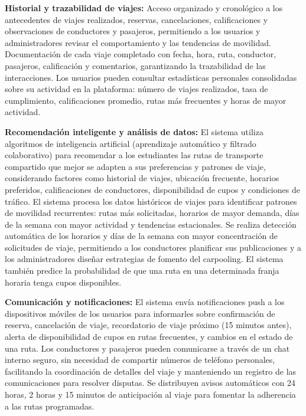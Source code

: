 \documentclass[11pt,a4paper]{article}
\begin{document}
\textbf{Historial y trazabilidad de viajes:} Acceso organizado y cronológico a los antecedentes de viajes realizados, reservas, cancelaciones, calificaciones y observaciones de conductores y pasajeros, permitiendo a los usuarios y administradores revisar el comportamiento y las tendencias de movilidad. Documentación de cada viaje completado con fecha, hora, ruta, conductor, pasajeros, calificación y comentarios, garantizando la trazabilidad de las interacciones. Los usuarios pueden consultar estadísticas personales consolidadas sobre su actividad en la plataforma: número de viajes realizados, tasa de cumplimiento, calificaciones promedio, rutas más frecuentes y horas de mayor actividad.

\textbf{Recomendación inteligente y análisis de datos:} El sistema utiliza algoritmos de inteligencia artificial (aprendizaje automático y filtrado colaborativo) para recomendar a los estudiantes las rutas de transporte compartido que mejor se adapten a sus preferencias y patrones de viaje, considerando factores como historial de viajes, ubicación frecuente, horarios preferidos, calificaciones de conductores, disponibilidad de cupos y condiciones de tráfico. El sistema procesa los datos históricos de viajes para identificar patrones de movilidad recurrentes: rutas más solicitadas, horarios de mayor demanda, días de la semana con mayor actividad y tendencias estacionales. Se realiza detección automática de los horarios y días de la semana con mayor concentración de solicitudes de viaje, permitiendo a los conductores planificar sus publicaciones y a los administradores diseñar estrategias de fomento del carpooling. El sistema también predice la probabilidad de que una ruta en una determinada franja horaria tenga cupos disponibles.

\textbf{Comunicación y notificaciones:} El sistema envía notificaciones push a los dispositivos móviles de los usuarios para informarles sobre confirmación de reserva, cancelación de viaje, recordatorio de viaje próximo (15 minutos antes), alerta de disponibilidad de cupos en rutas frecuentes, y cambios en el estado de una ruta. Los conductores y pasajeros pueden comunicarse a través de un chat interno seguro, sin necesidad de compartir números de teléfono personales, facilitando la coordinación de detalles del viaje y manteniendo un registro de las comunicaciones para resolver disputas. Se distribuyen avisos automáticos con 24 horas, 2 horas y 15 minutos de anticipación al viaje para fomentar la adherencia a las rutas programadas.
\end{document}

